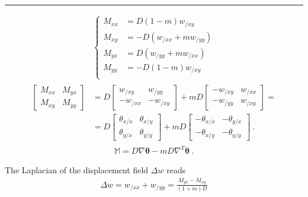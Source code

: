 \documentclass[letterpaper,10pt,english]{jupyterBook}
\begin{document}
\bigskip\hrule\bigskip

\begin{equation*}
\begin{split}\left\{ \begin{aligned}
  M_{xx} & = D( 1 - m ) w_{/xy} \\
  M_{xy} & = - D( w_{/xx} + m w_{/yy} ) \\
  M_{yx} & =   D( w_{/yy} + m w_{/xx} ) \\
  M_{yy} & = - D( 1 - m ) w_{/xy} \\
\end{aligned} \right.\end{split}
\end{equation*}\begin{equation*}
\begin{split}\begin{aligned}
  \begin{bmatrix} M_{xx} & M_{yx} \\ M_{xy} & M_{yy} \end{bmatrix}
  & = D \begin{bmatrix} w_{/xy} & w_{/yy} \\ - w_{/xx} & - w_{/xy} \end{bmatrix} + m D \begin{bmatrix} -w_{/xy} & w_{/xx} \\ -w_{/yy} & w_{/xy} \end{bmatrix} = \\
  & = D \begin{bmatrix} \theta_{x/x} & \theta_{x/y} \\ \theta_{y/x}  & \theta_{y/y} \end{bmatrix} + m D \begin{bmatrix} -\theta_{x/x} &  -\theta_{y/x} \\ -\theta_{x/y}& -\theta_{y/y} \end{bmatrix} \ .
\end{aligned}\end{split}
\end{equation*}\begin{equation*}
\begin{split}\mathbb{M} = D \nabla \boldsymbol\theta - m D \nabla^T \boldsymbol\theta \ .\end{split}
\end{equation*}


\sphinxAtStartPar
The Laplacian of the displacement field \(\Delta w\) reads
\begin{equation*}
\begin{split}\Delta w = w_{/xx} + w_{/yy} = \frac{M_{yx} - M_{xy}}{(1+m) D}\end{split}
\end{equation*}
\end{document}
